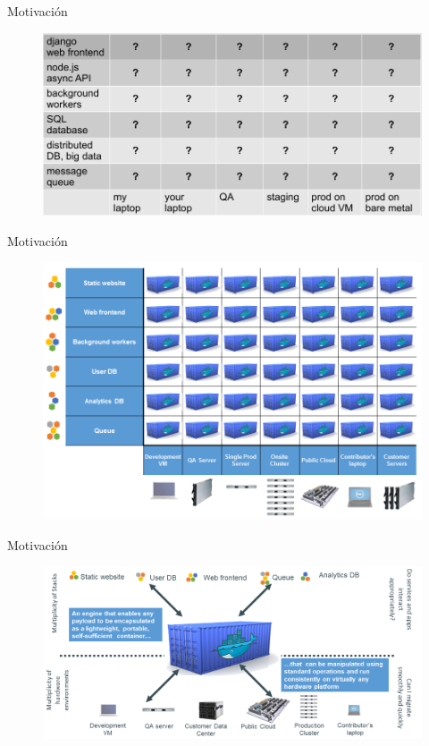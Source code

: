 \documentclass{bredelebeamer}
\begin{document}
\begin{frame}{Motivación}
	\begin{figure}
		\centering
\includegraphics[width=\textwidth,height=0.8\textheight,keepaspectratio]{images/matrix}
	\end{figure}
\end{frame}


\begin{frame}{Motivación}
	\begin{figure}
		\centering
\includegraphics[width=\textwidth,height=0.8\textheight,keepaspectratio]{images/eliminates-matrix-from-hell}
	\end{figure}
\end{frame}

\begin{frame}{Motivación}
	\begin{figure}
		\centering
\includegraphics[width=\textwidth,height=0.8\textheight,keepaspectratio]{images/shipping-container-for-code}
	\end{figure}
\end{frame}
\end{document}
